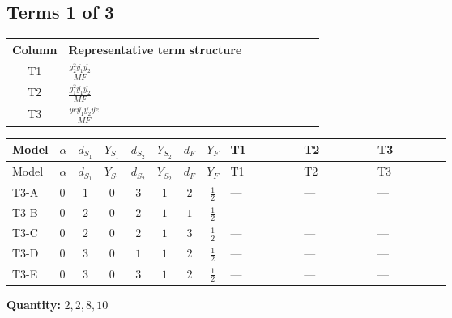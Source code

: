 \documentclass[8pt]{article}
\begin{document}
\begin{landscape}
\subsection*{Terms 1 of 3}
\begin{center}
\begin{tabular}{@{}c >{\raggedright\arraybackslash}p{0.82\linewidth}@{}}
\toprule
Column & Representative term structure \\
\midrule
T1 & \(\displaystyle \frac{g_{2}^{2} \overline{y_{1}} \overline{y_{2}}}{MF}\) \\
\midrule
T2 & \(\displaystyle \frac{g_{1}^{2} \overline{y_{1}} \overline{y_{2}}}{MF}\) \\
\midrule
T3 & \(\displaystyle \frac{ye \overline{y_{1}} \overline{y_{2}} \overline{ye}}{MF}\) \\
\midrule
\bottomrule
\end{tabular}
\end{center}
\smallskip
\tiny
\begin{longtable}{@{}llcccccc >{\raggedright\arraybackslash}p{0.21\linewidth} >{\raggedright\arraybackslash}p{0.21\linewidth} >{\raggedright\arraybackslash}p{0.21\linewidth}@{}}
\toprule
Model & $\alpha$ & $d_{S_1}$ & $Y_{S_1}$ & $d_{S_2}$ & $Y_{S_2}$ & $d_F$ & $Y_F$ & T1 & T2 & T3 \\
\midrule
\endfirsthead
\toprule
Model & $\alpha$ & $d_{S_1}$ & $Y_{S_1}$ & $d_{S_2}$ & $Y_{S_2}$ & $d_F$ & $Y_F$ & T1 & T2 & T3 \\
\midrule
\endhead
T3-A & $0$ & $1$ & $0$ & $3$ & $1$ & $2$ & $\frac{1}{2}$ & --- & --- & --- \\
\midrule
T3-B & $0$ & $2$ & $0$ & $2$ & $1$ & $1$ & $\frac{1}{2}$ & \scriptsize\adjustbox{max width=\linewidth}{$\begin{gathered} \frac{3 g_{2}^{2} \overline{y_{1}} \overline{y_{2}}}{4 MF}\end{gathered}$} & \scriptsize\adjustbox{max width=\linewidth}{$\begin{gathered} \frac{3 g_{1}^{2} \overline{y_{1}} \overline{y_{2}}}{8 MF}\end{gathered}$} & \scriptsize\adjustbox{max width=\linewidth}{$\begin{gathered} - \frac{ye \overline{y_{1}} \overline{y_{2}} \overline{ye}}{4 MF}\end{gathered}$} \\
\midrule
T3-C & $0$ & $2$ & $0$ & $2$ & $1$ & $3$ & $\frac{1}{2}$ & --- & --- & --- \\
\midrule
T3-D & $0$ & $3$ & $0$ & $1$ & $1$ & $2$ & $\frac{1}{2}$ & --- & --- & --- \\
\midrule
T3-E & $0$ & $3$ & $0$ & $3$ & $1$ & $2$ & $\frac{1}{2}$ & --- & --- & --- \\
\midrule
\bottomrule
\end{longtable}
\clearpage
\noindent\textbf{Quantity: }$\mathrm{2,2,8,10}$\par\smallskip

\end{landscape}
\end{document}
